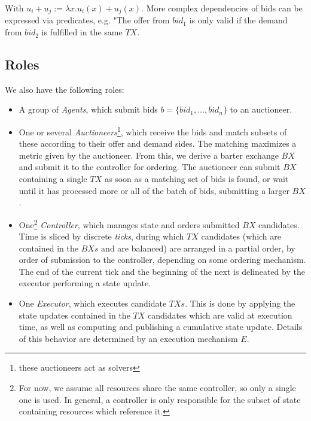With $u_i+u_j := \lambda x. u_i(x)+u_j(x)$.
More complex dependencies of bids can be expressed via predicates, e.g. "The offer from $bid_1$ is only valid if the demand from $bid_2$ is fulfilled in the same $TX$.

\subsection{Roles}
We also have the following roles:

\begin{itemize}
    \item A group of \textit{Agents}, which submit bids $b = \{bid_1, \dots, bid_n\}$ to an auctioneer.
    \item One or several \textit{Auctioneers}\footnote{these auctioneers act as solvers}, which receive the bids and match subsets of these according to their offer and demand sides. The matching maximizes a metric given by the auctioneer. From this, we derive a barter exchange $BX$ and submit it to the controller for ordering. The auctioneer can submit $BX$ containing a single $TX$ as soon as a matching set of bids is found, or wait until it has processed more or all of the batch of bids, submitting a larger $BX$.
    \item One\footnote{For now, we assume all resources share the same controller, so only a single one is used. In general, a controller is only responsible for the subset of state containing resources which reference it.} \textit{Controller}, which manages state and orders submitted $BX$ candidates. Time is sliced by discrete \textit{ticks}, during which $TX$ candidates (which are contained in the $BXs$ and are balanced) are arranged in a partial order, by order of submission to the controller, depending on some ordering mechanism. The end of the current tick and the beginning of the next is delineated by the executor performing a state update.
    \item One \textit{Executor}, which executes candidate $TXs$. This is done by applying the state updates contained in the $TX$ candidates which are valid at execution time, as well as computing and publishing a cumulative state update. Details of this behavior are determined by an execution mechanism $E$. %
\end{itemize}




